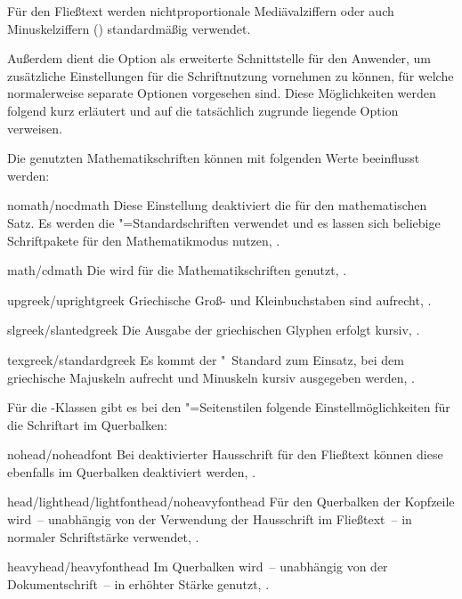 \begin{Declaration*}{}
\begin{Declaration*}{}
\begin{Declaration*}{}
\begin{Declaration}
\begin{values}{}
  Für den Fließtext werden nichtproportionale Mediävalziffern oder auch 
  Minuskelziffern (\textbf{}) standardmäßig verwendet.
\end{values}
%
Außerdem dient die Option  als erweiterte Schnittstelle 
für den Anwender, um zusätzliche Einstellungen für die Schriftnutzung vornehmen 
zu können, für welche normalerweise separate Optionen vorgesehen sind. Diese 
Möglichkeiten werden folgend kurz erläutert und auf die tatsächlich zugrunde 
liegende Option verweisen.

Die genutzten Mathematikschriften können mit folgenden Werte beeinflusst werden:
%
\begin{values}{}
\item[nomath/nocdmath] 
  Diese Einstellung deaktiviert die \OpenSans für den mathematischen Satz. Es 
  werden die "=Standardschriften verwendet und es lassen sich  
  beliebige Schriftpakete für den Mathematikmodus nutzen, 
  .
\item[math/cdmath]
  Die \OpenSans wird für die Mathematikschriften genutzt, 
  .
\item[upgreek/uprightgreek]
  Griechische Groß- und Kleinbuchstaben sind aufrecht, 
  .
\item[slgreek/slantedgreek]
  Die Ausgabe der griechischen Glyphen erfolgt kursiv, 
  .
\item[texgreek/standardgreek]
  Es kommt der "~Standard zum Einsatz, bei dem griechische 
  Majuskeln aufrecht und Minuskeln kursiv ausgegeben werden, 
  .
\end{values}
%
Für die \TUDScript-Klassen gibt es bei den "=Seitenstilen
folgende Einstellmöglichkeiten für die Schriftart im Querbalken:
%
\begin{values}{}
\item[nohead/noheadfont]
  Bei deaktivierter Hausschrift für den Fließtext können diese ebenfalls im 
  Querbalken deaktiviert werden, .
\item[head/lighthead/lightfonthead/noheavyfonthead]
  Für den Querbalken der Kopfzeile wird~-- unabhängig von der Verwendung der 
  Hausschrift im Fließtext~-- \OpenSans in normaler Schriftstärke verwendet, 
  .
\item[heavyhead/heavyfonthead]
  Im Querbalken wird~-- unabhängig von der Dokumentschrift~-- \OpenSans in 
  erhöhter Stärke genutzt, .
\end{values}
\end{Declaration}


\end{Declaration*}
\end{Declaration*}
\end{Declaration*}
